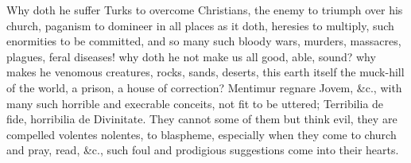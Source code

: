 {Why doth he suffer Turks to overcome Christians, the enemy to triumph
over his church, paganism to domineer in all places as it doth,
heresies to multiply, such enormities to be committed, and so many such
bloody wars, murders, massacres, plagues, feral diseases! why doth he
not make us all good, able, sound? why makes he venomous
creatures, rocks, sands, deserts, this earth itself the muck-hill of
the world, a prison, a house of correction? Mentimur regnare
Jovem, \&c., with many such horrible and execrable conceits, not fit to
be uttered; Terribilia de fide, horribilia de Divinitate. They cannot
some of them but think evil, they are compelled volentes nolentes, to
blaspheme, especially when they come to church and pray, read, \&c.,
such foul and prodigious suggestions come into their hearts.

}
